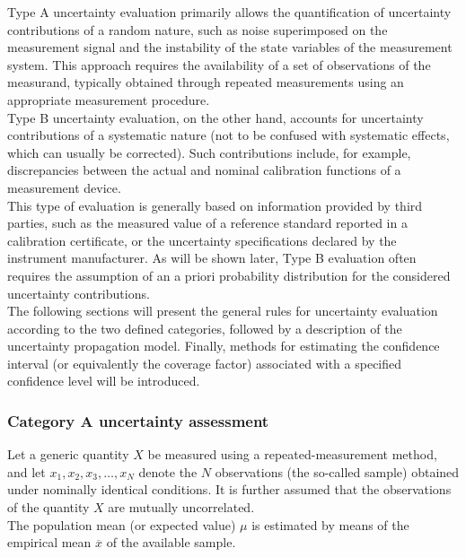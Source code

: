 \documentclass[../main.tex]{subfiles}
\begin{document}
Type A uncertainty evaluation primarily allows the quantification of uncertainty contributions of a random nature, such as noise superimposed on the measurement signal and the instability of the state variables of the measurement system. This approach requires the availability of a set of observations of the measurand, typically obtained through repeated measurements using an appropriate measurement procedure.\\

Type B uncertainty evaluation, on the other hand, accounts for uncertainty contributions of a systematic nature (not to be confused with systematic effects, which can usually be corrected). Such contributions include, for example, discrepancies between the actual and nominal calibration functions of a measurement device. \\

This type of evaluation is generally based on information provided by third parties, such as the measured value of a reference standard reported in a calibration certificate, or the uncertainty specifications declared by the instrument manufacturer. As will be shown later, Type B evaluation often requires the assumption of an a priori probability distribution for the considered uncertainty contributions.\\


The following sections will present the general rules for uncertainty evaluation according to the two defined categories, followed by a description of the uncertainty propagation model. Finally, methods for estimating the confidence interval (or equivalently the coverage factor) associated with a specified confidence level will be introduced.\\

\subsubsection{Category A uncertainty assessment}
\label{uncA}


Let a generic quantity $X$ be measured using a repeated-measurement method, and let $x_1, x_2, x_3, \dots, x_N$ denote the $N$ observations (the so-called sample) obtained under nominally identical conditions. It is further assumed that the observations of the quantity $X$ are mutually uncorrelated.\\

The population mean (or expected value) $\mu$ is estimated by means of the empirical mean  $\overline{x}$ of the available sample.
\end{document}
